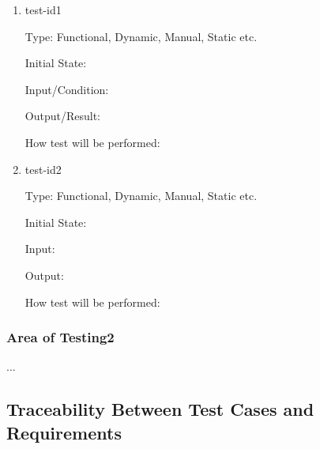 \documentclass[12pt, titlepage]{article}
\begin{document}
\begin{enumerate}

\item{test-id1\\}

Type: Functional, Dynamic, Manual, Static etc.
					
Initial State: 
					
Input/Condition: 
					
Output/Result: 
					
How test will be performed: 
					
\item{test-id2\\}

Type: Functional, Dynamic, Manual, Static etc.
					
Initial State: 
					
Input: 
					
Output: 
					
How test will be performed: 

\end{enumerate}

\subsubsection{Area of Testing2}

...

\subsection{Traceability Between Test Cases and Requirements}
\end{document}
